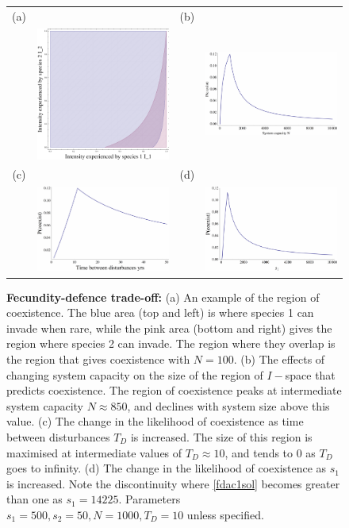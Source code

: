 \begin{figure}[htbp]
\begin{tabular}{cccc}
(a)&&(b)&\\
&\includegraphics[width=2in]{fdtotdis10.pdf}&&\includegraphics[width=2in]{fdtointwN.pdf} \\
(c)&&(d)&\\
&\includegraphics[width=2in]{fdtointwTd.pdf}&&\includegraphics[width=2in]{fdtointws1.pdf}
\end{tabular}
\caption{\textbf{Fecundity-defence trade-off:} (a) An example of the region of coexistence. The blue area (top and left) is where species 1 can invade when rare, while the pink area (bottom and right) gives the region where species 2 can invade. The region where they overlap is the region that gives coexistence with $N=100$. (b) The effects of changing system capacity on the size of the region of $I-$space that predicts coexistence. The region of coexistence peaks at intermediate system capacity $N\approx 850$, and declines with system size above this value. (c) The change in the likelihood of coexistence as time between disturbances $T_D$ is increased. The size of this region is maximised at intermediate values of $T_D \approx 10$, and tends to 0 as $T_D$ goes to infinity. (d) The change in the likelihood of coexistence as $s_1$ is increased. Note the discontinuity where \eqref{fdac1sol} becomes greater than one as $s_1=14225$.  Parameters $s_1=500,s_2=50,N=1000,T_D=10$ unless specified.}
\label{fd}
\end{figure}

